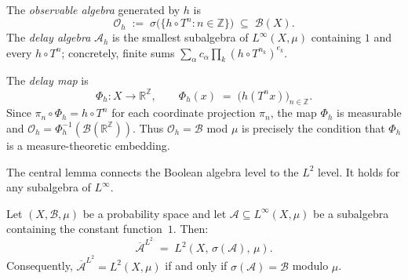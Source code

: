 \begin{definition}
\label{II:def:obs-algebra}
The \emph{observable algebra} generated by $h$ is
\[
  \mathcal{O}_h \;:=\; \sigma\!\bigl(\{h \circ T^n : n \in \mathbb{Z}\}\bigr)
  \;\subseteq\; \mathcal{B}(X).
\]
The \emph{delay algebra} $\mathcal{A}_h$ is the smallest subalgebra of
$L^\infty(X, \mu)$ containing $1$ and every $h \circ T^n$; concretely, finite
sums $\sum_\alpha c_\alpha \prod_k (h \circ T^{n_k})^{e_k}$.
\end{definition}

\begin{definition}
\label{II:def:delay-map}
The \emph{delay map} is
\[
  \Phi_h : X \to \mathbb{R}^\mathbb{Z},
  \qquad
  \Phi_h(x) \;=\; \bigl(h(T^n x)\bigr)_{n \in \mathbb{Z}}.
\]
Since $\pi_n \circ \Phi_h = h \circ T^n$ for each coordinate projection $\pi_n$,
the map $\Phi_h$ is measurable and
$\mathcal{O}_h = \Phi_h^{-1}(\mathcal{B}(\mathbb{R}^\mathbb{Z}))$.
Thus $\mathcal{O}_h = \mathcal{B}$ mod $\mu$ is precisely the condition that
$\Phi_h$ is a measure-theoretic embedding.
\end{definition}

The central lemma connects the Boolean algebra level to the $L^2$ level.
It holds for any subalgebra of $L^\infty$.

\begin{lemma}
\label{II:lem:density-bridge}
Let $(X, \mathcal{B}, \mu)$ be a probability space and let
$\mathcal{A} \subseteq L^\infty(X, \mu)$ be a subalgebra containing the
constant function~$1$.  Then:
\[
  \overline{\mathcal{A}}^{L^2}
  \;=\;
  L^2(X,\, \sigma(\mathcal{A}),\, \mu).
\]
Consequently, $\overline{\mathcal{A}}^{L^2} = L^2(X, \mu)$ if and only if
$\sigma(\mathcal{A}) = \mathcal{B}$ modulo $\mu$.
\end{lemma}

